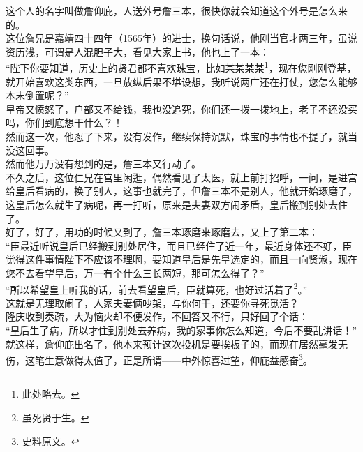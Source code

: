 \begin{multicols}{\theparacolNo}
这个人的名字叫做詹仰庇，人送外号詹三本，很快你就会知道这个外号是怎么来的。\\

这位詹兄是嘉靖四十四年（1565年）的进士，换句话说，他刚当官才两三年，虽说资历浅，可谓是人混胆子大，看见大家上书，他也上了一本：\\

“陛下你要知道，历史上的贤君都不喜欢珠宝，比如某某某某\footnote{此处略去。}，现在您刚刚登基，就开始喜欢这类东西，一旦放纵后果不堪设想，我听说两广还在打仗，您怎么能够本末倒置呢？”\\

皇帝又愤怒了，户部又不给钱，我也没追究，你们还一拨一拨地上，老子不还没买吗，你们到底想干什么？！\\

然而这一次，他忍了下来，没有发作，继续保持沉默，珠宝的事情也不提了，就当没这回事。\\

然而他万万没有想到的是，詹三本又行动了。\\

不久之后，这位仁兄在宫里闲逛，偶然看见了太医，就上前打招呼，一问，是进宫给皇后看病的，换了别人，这事也就完了，但詹三本不是别人，他就开始琢磨了，这皇后怎么就生了病呢，再一打听，原来是夫妻双方闹矛盾，皇后搬到别处去住了。\\

好了，好了，用功的时候又到了，詹三本琢磨来琢磨去，又上了第二本：\\

“臣最近听说皇后已经搬到别处居住，而且已经住了近一年，最近身体还不好，臣觉得这件事情陛下不应该不理啊，要知道皇后是先皇选定的，而且一向贤淑，现在您不去看望皇后，万一有个什么三长两短，那可怎么得了？”\\

“所以希望皇上听我的话，前去看望皇后，臣就算死，也好过活着了\footnote{虽死贤于生。}。”\\

这就是无理取闹了，人家夫妻俩吵架，与你何干，还要你寻死觅活？\\

隆庆收到奏疏，大为恼火却不便发作，不回答又不行，只好回了个话：\\

“皇后生了病，所以才住到别处去养病，我的家事你怎么知道，今后不要乱讲话！”\\

就这样，詹仰庇出名了，他本来预计这次投机是要挨板子的，而现在居然毫发无伤，这笔生意做得太值了，正是所谓——中外惊喜过望，仰庇益感奋\footnote{史料原文。}。\\


\end{multicols}
